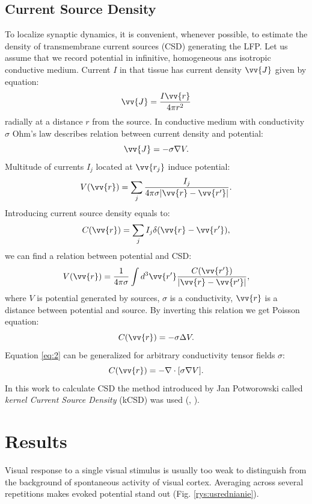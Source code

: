 \documentclass{pracalicmgr}
\begin{document}
    \section{Current Source Density}
    To localize synaptic dynamics, it is convenient, whenever possible, to estimate the density of transmembrane current sources (CSD) generating the LFP.
    Let us assume that we record potential in infinitive, homogeneous ans isotropic conductive medium. Current $I$ in that tissue has current density $\vv{J}$ given by equation:
    \begin{equation}
    \vv{J}= \frac{I \vv{r}}{4\pi r^2}
    \end{equation}
    radially at a distance $r$ from the source. In conductive medium with conductivity $\sigma$ Ohm's law describes relation between current density and potential:
    \begin{equation}
    \vv{J}=-\sigma \nabla V.
    \end{equation}
    Multitude of currents $I_j$ located at $\vv{r_j}$ induce potential:
    \begin{equation}
    V(\vv{r})=\sum_{j} \frac{I_j}{4 \pi \sigma |\vv{r}-\vv{r'}|} .
    \end{equation}
    Introducing current source density equals to:
    \begin{equation}
    C(\vv{r})=\sum_{j} I_j \delta (\vv{r}-\vv{r'}),
    \end{equation}
    we can find a relation between potential and CSD:
    \begin{equation}
    V(\vv{r})=\frac{1}{4\pi\sigma}\int d^3 \vv{r'} \frac{C(\vv{r'})}{|\vv{r}-\vv{r'}|},
    \end{equation}
    where $V$ is potential generated by sources, $\sigma$ is a conductivity, $\vv{r}$ is a distance between potential and source. By inverting this relation we get Poisson equation:
    \begin{equation}
    C(\vv{r})=-\sigma \Delta V.
    \label{eq:2}
    \end{equation}
    Equation \ref{eq:2} can be generalized for arbitrary conductivity tensor fields $\sigma$:
    \begin{equation}
    C(\vv{r})=-\nabla \cdot [\sigma \nabla V].
    \end{equation}
    In this work to calculate CSD the method introduced by Jan Potworowski called \textit{kernel Current Source Density} (kCSD) was used (\cite{wojcik}, \cite{potworowski}).
    
    \chapter{Results}
    Visual response to a single visual stimulus is usually too weak to distinguish from the background of spontaneous activity of visual cortex. Averaging across several repetitions makes evoked potential stand out (Fig. \ref{rys:usrednianie}).
    
\end{document}
